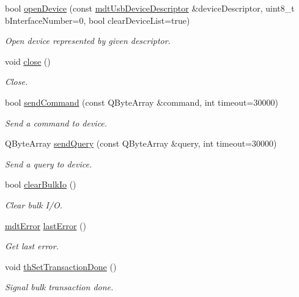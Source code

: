 \begin{DoxyCompactItemize}
bool \hyperlink{classmdt_usbtmc_port_abe30ec243e9dbf3de49cb1d9be5e1a16}{open\-Device} (const \hyperlink{classmdt_usb_device_descriptor}{mdt\-Usb\-Device\-Descriptor} \&device\-Descriptor, uint8\-\_\-t b\-Interface\-Number=0, bool clear\-Device\-List=true)
\begin{DoxyCompactList}\small\item\em Open device represented by given descriptor. \end{DoxyCompactList}\item 
void \hyperlink{classmdt_usbtmc_port_a6fec5e49a42e6c2e6202a8b2f7f0dc37}{close} ()
\begin{DoxyCompactList}\small\item\em Close. \end{DoxyCompactList}\item 
bool \hyperlink{classmdt_usbtmc_port_ad03633a2c6289974d79f361c6dbba5af}{send\-Command} (const Q\-Byte\-Array \&command, int timeout=30000)
\begin{DoxyCompactList}\small\item\em Send a command to device. \end{DoxyCompactList}\item 
Q\-Byte\-Array \hyperlink{classmdt_usbtmc_port_a0c250cc416a01d2dd704b629b163d3a6}{send\-Query} (const Q\-Byte\-Array \&query, int timeout=30000)
\begin{DoxyCompactList}\small\item\em Send a query to device. \end{DoxyCompactList}\item 
bool \hyperlink{classmdt_usbtmc_port_afbf76bc83c54937dfb0e88ad6f517dc5}{clear\-Bulk\-Io} ()
\begin{DoxyCompactList}\small\item\em Clear bulk I/\-O. \end{DoxyCompactList}\item 
\hyperlink{classmdt_error}{mdt\-Error} \hyperlink{classmdt_usbtmc_port_ad08e3ff4682797e8604400026418bdc8}{last\-Error} ()
\begin{DoxyCompactList}\small\item\em Get last error. \end{DoxyCompactList}\item 
void \hyperlink{classmdt_usbtmc_port_ab72af815af2f766e4062e2db43998f7c}{th\-Set\-Transaction\-Done} ()
\begin{DoxyCompactList}\small\item\em Signal bulk transaction done. \end{DoxyCompactList}\item 

\end{DoxyCompactItemize}
